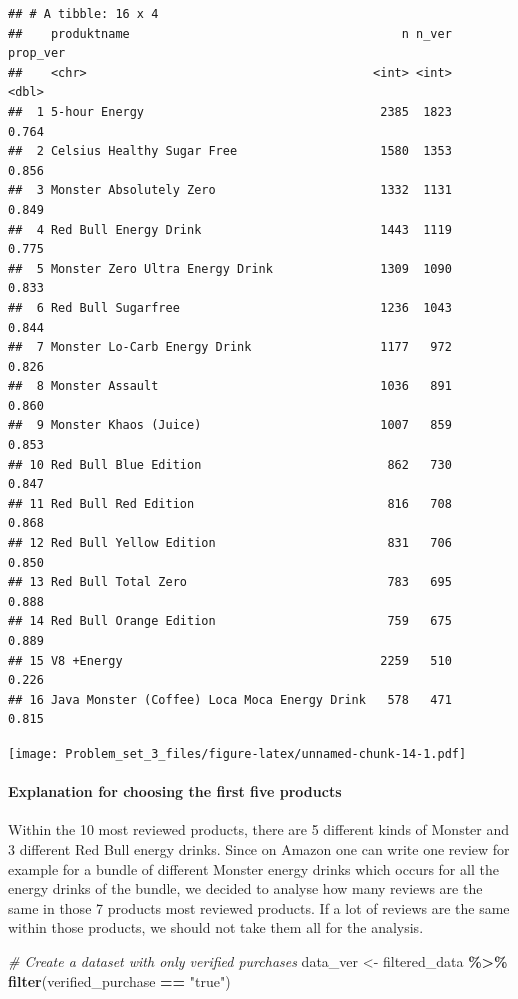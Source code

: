 \documentclass[
]{article}
\newenvironment{Shaded}{\begin{snugshade}}{\end{snugshade}}
\newcommand{\CommentTok}[1]{\textcolor[rgb]{0.56,0.35,0.01}{\textit{#1}}}
\newcommand{\FunctionTok}[1]{\textcolor[rgb]{0.13,0.29,0.53}{\textbf{#1}}}
\newcommand{\NormalTok}[1]{#1}
\newcommand{\OtherTok}[1]{\textcolor[rgb]{0.56,0.35,0.01}{#1}}
\newcommand{\SpecialCharTok}[1]{\textcolor[rgb]{0.81,0.36,0.00}{\textbf{#1}}}
\newcommand{\StringTok}[1]{\textcolor[rgb]{0.31,0.60,0.02}{#1}}
\begin{document}
\begin{verbatim}
## # A tibble: 16 x 4
##    produktname                                      n n_ver prop_ver
##    <chr>                                        <int> <int>    <dbl>
##  1 5-hour Energy                                 2385  1823    0.764
##  2 Celsius Healthy Sugar Free                    1580  1353    0.856
##  3 Monster Absolutely Zero                       1332  1131    0.849
##  4 Red Bull Energy Drink                         1443  1119    0.775
##  5 Monster Zero Ultra Energy Drink               1309  1090    0.833
##  6 Red Bull Sugarfree                            1236  1043    0.844
##  7 Monster Lo-Carb Energy Drink                  1177   972    0.826
##  8 Monster Assault                               1036   891    0.860
##  9 Monster Khaos (Juice)                         1007   859    0.853
## 10 Red Bull Blue Edition                          862   730    0.847
## 11 Red Bull Red Edition                           816   708    0.868
## 12 Red Bull Yellow Edition                        831   706    0.850
## 13 Red Bull Total Zero                            783   695    0.888
## 14 Red Bull Orange Edition                        759   675    0.889
## 15 V8 +Energy                                    2259   510    0.226
## 16 Java Monster (Coffee) Loca Moca Energy Drink   578   471    0.815
\end{verbatim}

\texttt{[image: Problem\_set\_3\_files/figure-latex/unnamed-chunk-14-1.pdf]}

\hypertarget{explanation-for-choosing-the-first-five-products}{%
\paragraph{Explanation for choosing the first five
products}\label{explanation-for-choosing-the-first-five-products}}

Within the 10 most reviewed products, there are 5 different kinds of
Monster and 3 different Red Bull energy drinks. Since on Amazon one can
write one review for example for a bundle of different Monster energy
drinks which occurs for all the energy drinks of the bundle, we decided
to analyse how many reviews are the same in those 7 products most
reviewed products. If a lot of reviews are the same within those
products, we should not take them all for the analysis.

\begin{Shaded}
\begin{Highlighting}[]
\CommentTok{\# Create a dataset with only verified purchases}
\NormalTok{data\_ver }\OtherTok{\textless{}{-}}\NormalTok{ filtered\_data }\SpecialCharTok{\%\textgreater{}\%}
  \FunctionTok{filter}\NormalTok{(verified\_purchase }\SpecialCharTok{==} \StringTok{"true"}\NormalTok{)}
\end{Highlighting}
\end{Shaded}
\end{document}

